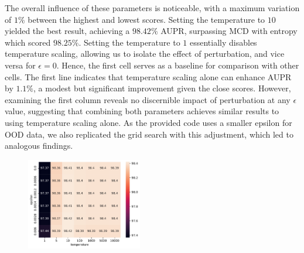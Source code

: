 The overall influence of these parameters is noticeable, with a maximum variation of $1\%$ between the highest and lowest scores. Setting the temperature to $ 10 $ yielded the best result, achieving a $98.42\%$ AUPR, surpassing MCD with entropy which scored $98.25\%$. Setting the temperature to $ 1 $ essentially disables temperature scaling, allowing us to isolate the effect of perturbation, and vice versa for $ \epsilon = 0 $. Hence, the first cell serves as a baseline for comparison with other cells. The first line indicates that temperature scaling alone can enhance AUPR by $1.1\%$, a modest but significant improvement given the close scores. However, examining the first column reveals no discernible impact of perturbation at any $ \epsilon $ value, suggesting that combining both parameters achieves similar results to using temperature scaling alone. As the provided code uses a smaller epsilon for OOD data, we also replicated the grid search with this adjustment, which led to analogous findings.
\begin{figure}[H]
    \centering
    \includegraphics[width=0.45\textwidth]{odin_grid_search.pdf}
    \caption{}
    \label{fig:odin_grid_search}
\end{figure}